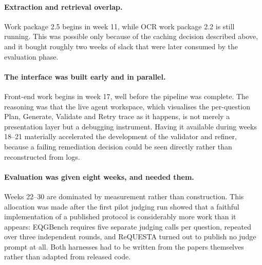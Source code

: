 \paragraph{Extraction and retrieval overlap.} Work package 2.5 begins in week 11,
while OCR work package 2.2 is still running. This was possible only because of the
caching decision described above, and it bought roughly two weeks of slack that were
later consumed by the evaluation phase.

\paragraph{The interface was built early and in parallel.} Front-end work begins in
week 17, well before the pipeline was complete. The reasoning was that the live agent
workspace, which visualises the per-question Plan, Generate, Validate and Retry
trace as it happens, is not merely a presentation layer but a debugging instrument.
Having it available during weeks 18--21 materially accelerated the development of the
validator and refiner, because a failing remediation decision could be seen directly
rather than reconstructed from logs.

\paragraph{Evaluation was given eight weeks, and needed them.} Weeks 22--30 are
dominated by measurement rather than construction. This allocation was made after the
first pilot judging run showed that a faithful implementation of a published protocol
is considerably more work than it appears: EQGBench requires five separate judging
calls per question, repeated over three independent rounds, and ReQUESTA turned out
to publish no judge prompt at all. Both harnesses had to be written from the papers
themselves rather than adapted from released code.

